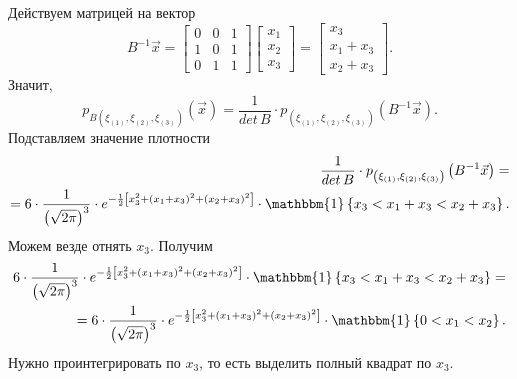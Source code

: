 \begin{enumerate}[label=\alph*)]
  Действуем матрицей на вектор
  $$B^{-1} \vec{x} =
    \begin{bmatrix}
      0 & 0 & 1 \\
      1 & 0 & 1 \\
      0 & 1 & 1
    \end{bmatrix}
    \begin{bmatrix}
      x_1 \\
      x_2 \\
      x_3
    \end{bmatrix} =
    \begin{bmatrix}
      x_3 \\
      x_1 + x_3 \\
      x_2 + x_3
    \end{bmatrix}.$$
  Значит,
  $$p_{B \left( \xi_{ \left( 1 \right) }, \xi_{ \left( 2 \right) }, \xi_{ \left( 3 \right) } \right) }
    \left( \vec{x} \right) =
    \frac{1}{det \, B} \cdot
    p_{ \left( \xi_{ \left( 1 \right) }, \xi_{ \left( 2 \right) }, \xi_{ \left( 3 \right) } \right) }
    \left( B^{-1} \vec{x} \right).$$
  Подставляем значение плотности
  \begin{equation*}
    \begin{split}
      \frac{1}{det \, B} \cdot
      p_{ \left( \xi_{ \left( 1 \right) }, \xi_{ \left( 2 \right) }, \xi_{ \left( 3 \right) } \right) }
      \left( B^{-1} \vec{x} \right) = \\
      = 6 \cdot \frac{1}{ \left( \sqrt{2 \pi } \right)^3} \cdot
      e^{- \frac{1}{2} \left[ x_3^2 + \left( x_1 + x_3 \right)^2 + \left( x_2 + x_3 \right)^2 \right] } \cdot
      \mathbbm{1} \left\{ x_3 < x_1 + x_3 < x_2 + x_3 \right\}.
    \end{split}
  \end{equation*}
  Можем везде отнять $x_3$.
  Получим
  \begin{equation*}
    \begin{split}
      6 \cdot \frac{1}{ \left( \sqrt{2 \pi } \right)^3} \cdot
      e^{- \frac{1}{2} \left[ x_3^2 + \left( x_1 + x_3 \right)^2 + \left( x_2 + x_3 \right)^2 \right] } \cdot
      \mathbbm{1} \left\{ x_3 < x_1 + x_3 < x_2 + x_3 \right\} = \\
      = 6 \cdot \frac{1}{ \left( \sqrt{2 \pi } \right)^3} \cdot
      e^{- \frac{1}{2} \left[ x_3^2 + \left( x_1 + x_3 \right)^2 + \left( x_2 + x_3 \right)^2 \right] } \cdot
      \mathbbm{1} \left\{ 0 < x_1 < x_2 \right\}.
    \end{split}
  \end{equation*}
  Нужно проинтегрировать по $x_3$, то есть выделить полный квадрат по $x_3$.


\end{enumerate}
